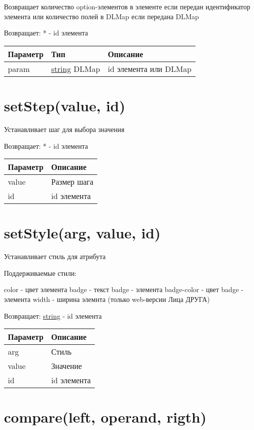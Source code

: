 Возвращает количество option-элементов в элементе если передан
идентификатор элемента или количество полей в DLMap если передана DLMap

Возвращает: * - id элемента

\begin{longtable}[]{@{}lll@{}}
\toprule
Параметр & Тип & Описание\tabularnewline
\midrule
\endhead
param & \protect\hyperlink{string}{string} \textbar{} DLMap & id
элемента или DLMap\tabularnewline
\bottomrule
\end{longtable}

\hypertarget{setstepvalue-id}{%
\section{setStep(value, id)}\label{setstepvalue-id}}

Устанавливает шаг для выбора значения

Возвращает: * - id элемента

\begin{longtable}[]{@{}ll@{}}
\toprule
Параметр & Описание\tabularnewline
\midrule
\endhead
value & Размер шага\tabularnewline
id & id элемента\tabularnewline
\bottomrule
\end{longtable}

\hypertarget{setstylearg-value-id-string}{%
\section{setStyle(arg, value, id)}\label{setstylearg-value-id-string}}

Устанавливает стиль для атрибута

Поддерживаемые стили:

color - цвет элемента badge - текст badge - элемента badge-color - цвет
badge - элемента width - ширина элемнта (только web-версии Лица ДРУГА)

Возвращает: \protect\hyperlink{string}{string} - id элемента

\begin{longtable}[]{@{}ll@{}}
\toprule
Параметр & Описание\tabularnewline
\midrule
\endhead
arg & Стиль\tabularnewline
value & Значение\tabularnewline
id & id элемента\tabularnewline
\bottomrule
\end{longtable}

\hypertarget{compareleft-operand-rigth}{%
\section{compare(left, operand,
rigth)}\label{compareleft-operand-rigth}}

